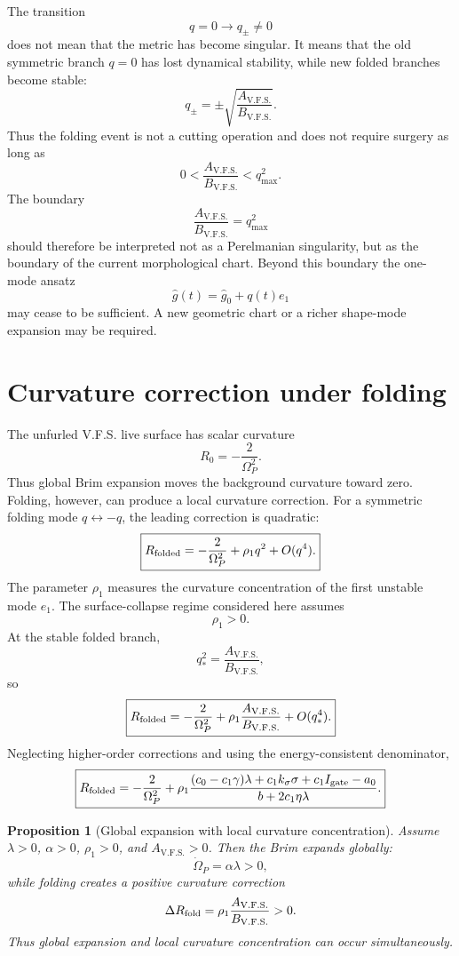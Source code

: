\documentclass[11pt,a4paper]{article}
\newcommand{\VFS}{\ensuremath{\mathrm{V.F.S.}}}
\newcommand{\Op}{\Omega_P}
\newcommand{\Igate}{I_{\rm gate}}
\theoremstyle{plain}
\newtheorem{proposition}{Proposition}
\theoremstyle{remark}
\theoremstyle{definition}
\begin{document}
The transition
\[
q=0\longrightarrow q_\pm\ne0
\]
does not mean that the metric has become singular. It means that the old symmetric branch $q=0$ has
lost dynamical stability, while new folded branches become stable:
\[
q_\pm=\pm\sqrt{\frac{A_{\VFS}}{B_{\VFS}}}.
\]
Thus the folding event is not a cutting operation and does not require surgery as long as
\[
\boxed{
0<\frac{A_{\VFS}}{B_{\VFS}}<q_{\max}^2.
}
\]
The boundary
\[
\frac{A_{\VFS}}{B_{\VFS}}=q_{\max}^2
\]
should therefore be interpreted not as a Perelmanian singularity, but as the boundary of the current
morphological chart. Beyond this boundary the one-mode ansatz
\[
\widehat g(t)=\widehat g_0+q(t)e_1
\]
may cease to be sufficient. A new geometric chart or a richer shape-mode expansion may be required.

\begin{center}
\end{center}

\section{Curvature correction under folding}
The unfurled V.F.S. live surface has scalar curvature
\[
R_0=-\frac{2}{\Op^2}.
\]
Thus global Brim expansion moves the background curvature toward zero. Folding, however, can produce
a local curvature correction. For a symmetric folding mode $q\leftrightarrow -q$, the leading
correction is quadratic:
\[
\boxed{
R_{\rm folded}= -\frac{2}{\Op^2}+\rho_1 q^2+O(q^4).
}
\]
The parameter $\rho_1$ measures the curvature concentration of the first unstable mode $e_1$. The
surface-collapse regime considered here assumes
\[
\rho_1>0.
\]
At the stable folded branch,
\[
q_\ast^2=\frac{A_{\VFS}}{B_{\VFS}},
\]
so
\[
\boxed{
R_{\rm folded}
=
-\frac{2}{\Op^2}
+
\rho_1\frac{A_{\VFS}}{B_{\VFS}}
+O(q_\ast^4).
}
\]
Neglecting higher-order corrections and using the energy-consistent denominator,
\[
\boxed{
R_{\rm folded}
=
-\frac{2}{\Op^2}
+
\rho_1
\frac{(c_0-c_1\gamma)\lambda+c_1k_\sigma\sigma+c_1\Igate-a_0}
{b+2c_1\eta\lambda}.
}
\]

\begin{proposition}[Global expansion with local curvature concentration]
Assume $\lambda>0$, $\alpha>0$, $\rho_1>0$, and $A_{\VFS}>0$. Then the Brim expands globally:
\[
\dot\Op=\alpha\lambda>0,
\]
while folding creates a positive curvature correction
\[
\Delta R_{\rm fold}=\rho_1\frac{A_{\VFS}}{B_{\VFS}}>0.
\]
Thus global expansion and local curvature concentration can occur simultaneously.
\end{proposition}
\end{document}
